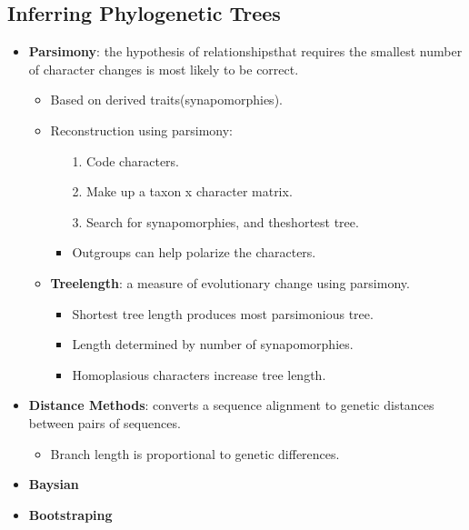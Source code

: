 \documentclass[12pt,a4paper]{article}
\begin{document}
\subsection{Inferring Phylogenetic Trees}
\begin{itemize}    
    \item \textbf{Parsimony}: the hypothesis of relationshipsthat requires the {\color{o-Sun}smallest number} of {\color{o-Sun} character changes} is most likely to be correct.
        \begin{itemize}
            \item Based on {\color{false}derived} traits(synapomorphies).
            \item Reconstruction using parsimony:
                \begin{itemize}
                    \item[1.] Code characters.
                    \item[2.] Make up a taxon x character matrix.
                    \item[3.] Search for synapomorphies, and theshortest tree.
                    \item Outgroups can help polarize the characters. 
                \end{itemize}
            \item \textbf{Treelength}: a measure of evolutionary change using parsimony. 
                \begin{itemize}
                    \item Shortest tree length produces most parsimonious tree.
                    \item Length determined by number of synapomorphies.
                    \item Homoplasious characters increase tree length.
                \end{itemize}
        \end{itemize}
    \item \textbf{Distance Methods}: converts a sequence alignment to genetic distances between pairs of sequences.
        \begin{itemize}
            \item Branch length is proportional to genetic differences.
        \end{itemize}
    \item \textbf{Baysian}
    \item \textbf{Bootstraping}
\end{itemize}
\end{document}
